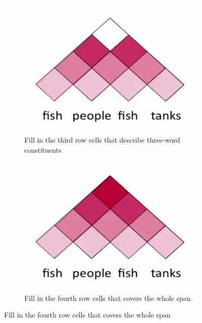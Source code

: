 \documentclass[11pt]{article}
\begin{document}
\begin{figure}[H]
	\begin{subfigure}{0.45\linewidth}
		\centering
		\includegraphics[width=0.9\linewidth]{img/cky_constituency_parsing_graph03.png}
		\caption{Fill in the third row cells that describe three-word constituents}
	\end{subfigure}
	\hspace{\fill}
	\begin{subfigure}{0.45\linewidth}
		\centering
		\includegraphics[width=0.9\linewidth]{img/cky_constituency_parsing_graph04.png}
		\caption{Fill in the fourth row cells that covers the whole span}
	\end{subfigure}
\end{figure}
\end{document}
